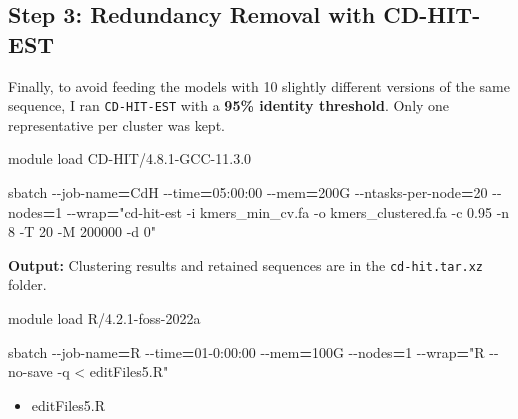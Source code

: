 \documentclass[
]{book}
\newenvironment{Shaded}{\begin{snugshade}}{\end{snugshade}}
\newcommand{\AttributeTok}[1]{\textcolor[rgb]{0.77,0.63,0.00}{#1}}
\newcommand{\ExtensionTok}[1]{#1}
\newcommand{\NormalTok}[1]{#1}
\newcommand{\OperatorTok}[1]{\textcolor[rgb]{0.81,0.36,0.00}{\textbf{#1}}}
\newcommand{\StringTok}[1]{\textcolor[rgb]{0.31,0.60,0.02}{#1}}
\providecommand{\tightlist}{%
  \setlength{\itemsep}{0pt}\setlength{\parskip}{0pt}}
\begin{document}
\hypertarget{step-3-redundancy-removal-with-cd-hit-est}{%
\subsection{Step 3: Redundancy Removal with CD-HIT-EST}\label{step-3-redundancy-removal-with-cd-hit-est}}

Finally, to avoid feeding the models with 10 slightly different versions of the same sequence, I ran \texttt{CD-HIT-EST} with a \textbf{95\% identity threshold}. Only one representative per cluster was kept.

\begin{Shaded}
\begin{Highlighting}[]
\ExtensionTok{module}\NormalTok{ load CD{-}HIT/4.8.1{-}GCC{-}11.3.0}

\ExtensionTok{sbatch} \AttributeTok{{-}{-}job{-}name}\OperatorTok{=}\NormalTok{CdH }\AttributeTok{{-}{-}time}\OperatorTok{=}\NormalTok{05:00:00 }\AttributeTok{{-}{-}mem}\OperatorTok{=}\NormalTok{200G }\AttributeTok{{-}{-}ntasks{-}per{-}node}\OperatorTok{=}\NormalTok{20 }\AttributeTok{{-}{-}nodes}\OperatorTok{=}\NormalTok{1 }\AttributeTok{{-}{-}wrap}\OperatorTok{=}\StringTok{"cd{-}hit{-}est {-}i kmers\_min\_cv.fa {-}o kmers\_clustered.fa {-}c 0.95 {-}n 8 {-}T 20 {-}M 200000 {-}d 0"}
\end{Highlighting}
\end{Shaded}

\textbf{Output:} Clustering results and retained sequences are in the \texttt{cd-hit.tar.xz} folder.

\begin{Shaded}
\begin{Highlighting}[]
\ExtensionTok{module}\NormalTok{ load R/4.2.1{-}foss{-}2022a}

\ExtensionTok{sbatch} \AttributeTok{{-}{-}job{-}name}\OperatorTok{=}\NormalTok{R }\AttributeTok{{-}{-}time}\OperatorTok{=}\NormalTok{01{-}0:00:00 }\AttributeTok{{-}{-}mem}\OperatorTok{=}\NormalTok{100G }\AttributeTok{{-}{-}nodes}\OperatorTok{=}\NormalTok{1 }\AttributeTok{{-}{-}wrap}\OperatorTok{=}\StringTok{"R {-}{-}no{-}save {-}q \textless{} editFiles5.R"}
\end{Highlighting}
\end{Shaded}

\begin{itemize}
\tightlist
\item
  editFiles5.R
\end{itemize}
\end{document}
